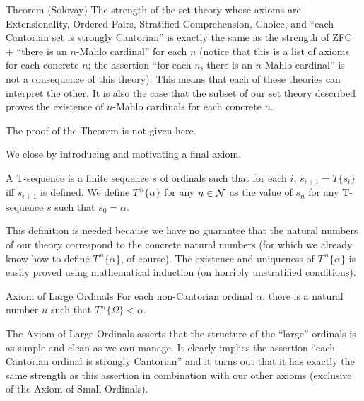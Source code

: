 \begin{Thm}{Theorem (Solovay)}
 The strength of the set theory whose axioms
 are Extensionality, Ordered Pairs,
 Stratified Comprehension,
 Choice, 
 and ``each Cantorian set is strongly
 Cantorian'' is exactly the same 
 as the strength of ZFC $+$ ``there is an
 $n$-Mahlo cardinal'' 
 for each $n$ (notice that this is a list of axioms for each concrete
 $n$; the assertion ``for each $n$, there is an $n$-Mahlo cardinal'' is
 {\upshape not} a consequence of this theory).  This means that each of
 these theories can interpret the other.  It is also the case that the
 subset of our set theory described proves the existence of $n$-Mahlo
 cardinals for each concrete $n$.
\end{Thm}


The proof of the Theorem is not given here.

We close by introducing and motivating a final axiom.

\begin{definition}
 A {\upshape T-sequence} is a
 finite
 sequence $s$ of ordinals such that for each $i$,
 $s_{i+1}= T\{s_i\}$ iff $s_{i+1}$ 
 is defined.  We define $T^{\,n}\{\alpha\}$ for any $n \in {\cal N}$ as the
 value of $s_n$ for any T-sequence $s$ such that $s_0 = \alpha$.
\end{definition}

This definition is needed because we have no guarantee that the
natural numbers of our theory correspond to the concrete
natural numbers (for which we already know how to define $T^{\,n}\{\alpha\}$,
of
course).  The existence and uniqueness of $T^{\,n}\{\alpha\}$ is easily
proved using mathematical induction (on horribly unstratified
conditions).

\begin{axiom}{Axiom of Large Ordinals}
 For each non-Cantorian ordinal
 $\alpha$, there is a natural number $n$ such that $T^{\,n}\{\Omega\} <
 \alpha$.
\end{axiom}

The Axiom of Large Ordinals asserts that the structure of the
``large'' ordinals is as simple and clean as we can manage.  It
clearly implies the assertion ``each Cantorian ordinal is strongly
Cantorian'' and it turns out that it has exactly the same strength as
this assertion in combination with our other axioms (exclusive of the
Axiom of Small Ordinals).

